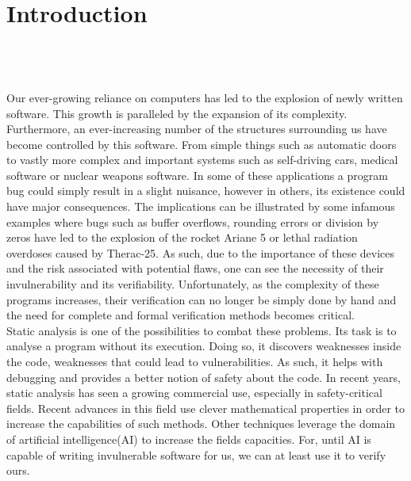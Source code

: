 
\setcounter{chapter}{0}

\chapter{Introduction}
\mbox{}\\
\mbox{}\\
\mbox{}\\
Our ever-growing reliance on computers has led to the explosion of newly written software. This growth is paralleled by the expansion of its complexity. Furthermore, an ever-increasing number of the structures surrounding us have become controlled by this software. From simple things such as automatic doors to vastly more complex and important systems such as self-driving cars, medical software or nuclear weapons software. In some of these applications a program bug could simply result in a slight nuisance, however in others, its existence could have major consequences. The implications can be illustrated by some infamous examples where bugs such as buffer overflows, rounding errors or division by zeros have led to the explosion of the rocket Ariane 5 or lethal radiation overdoses caused by Therac-25. As such, due to the importance of these devices and the risk associated with potential flaws, one can see the necessity of their invulnerability and its verifiability. Unfortunately, as the complexity of these programs increases, their verification can no longer be simply done by hand and the need for complete and formal verification methods becomes critical.\\
Static analysis is one of the possibilities to combat these problems. Its task is to analyse a program without its execution. Doing so, it discovers weaknesses inside the code, weaknesses that could lead to vulnerabilities. As such, it helps with debugging and provides a better notion of safety about the code. In recent years, static analysis has seen a growing commercial use, especially in safety-critical fields. Recent advances in this field use clever mathematical properties in order to increase the capabilities of such methods. Other techniques leverage the domain of artificial intelligence(AI) to increase the fields capacities. For, until AI is capable of writing invulnerable software for us, we can at least use it to verify ours.
